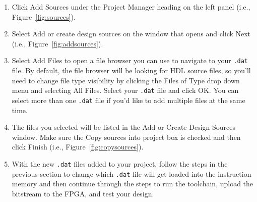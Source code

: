 \documentclass{article}
\begin{document}
\begin{enumerate}
\item Click Add Sources under the Project Manager heading on the left panel
(i.e., Figure~\ref{fig:sources}).

\item Select Add or create design sources on the window that opens and click
Next (i.e., Figure~\ref{fig:addsources}).

\item Select Add Files to open a file browser you can use to navigate to your
\verb|.dat| file.  By default, the file browser will be looking for HDL source
files, so you'll need to change file type visibility by clicking the Files of
Type drop down menu and selecting All Files.  Select your \verb|.dat| file and
click OK.  You can select more than one \verb|.dat| file if you'd like to add
multiple files at the same time.

\item The files you selected will be listed in the Add or Create Design Sources
window.  Make sure the Copy sources into project box is checked and then click
Finish (i.e., Figure~\ref{fig:copysources}).

\item  With the new \verb|.dat| files added to your project, follow the steps in
the previous section to change which \verb|.dat| file will get loaded into the
instruction memory and then continue through the steps to run the toolchain,
upload the bitstream to the FPGA, and test your design.
\end{enumerate}



\end{document}
